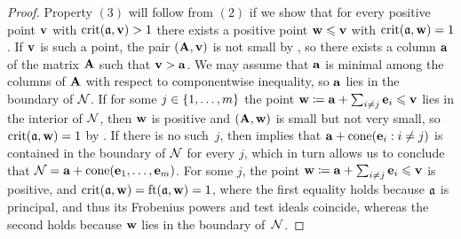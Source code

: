 \documentclass{amsart}
\begin{document}
\begin{proof}
   Property $(3)$ will follow from $(2)$ if we show that for every positive point $\mathbf{v}$ with $\operatorname{crit}(\mathfrak{a},\mathbf{v})>1$ there exists a positive point $\mathbf{w} \leqslant \mathbf{v}$ with $\operatorname{crit}(\mathfrak{a},\mathbf{w})=1$.
   If $\mathbf{v}$ is such a point, the pair $(\mathbf{A},\mathbf{v})$ is not small by , so there exists a column $\mathbf{a}$ of the matrix $\mathbf{A}$ such that $\mathbf{v} > \mathbf{a}$.
   We may assume that $\mathbf{a}$ is minimal among the columns of $\mathbf{A}$ with respect to componentwise inequality, so $\mathbf{a}$ lies in the boundary of $\mathcal{N}$.
   If for some $j \in \{1,\ldots,m\}$ the point $\mathbf{w} \coloneqq \mathbf{a}+ \sum_{i\ne j} \mathbf{e}_i \leqslant \mathbf{v}$ lies in the interior of $\mathcal{N}$, then $\mathbf{w}$ is positive and $(\mathbf{A},\mathbf{w})$ is small but not very small, so $\operatorname{crit}(\mathfrak{a},\mathbf{w}) = 1$ by .
   If there is no such~$j$, then  implies that $\mathbf{a}+\operatorname{cone}(\mathbf{e}_i: i\ne j)$ is contained in the boundary of $\mathcal{N}$ for every $j$, which in turn allows us to conclude that $\mathcal{N} = \mathbf{a} + \operatorname{cone}(\mathbf{e}_1,\ldots,\mathbf{e}_m)$.
   For some $j$, the point $\mathbf{w} \coloneqq \mathbf{a}+ \sum_{i\ne j} \mathbf{e}_i \leqslant \mathbf{v}$ is positive, and $\operatorname{crit}(\mathfrak{a},\mathbf{w}) = \operatorname{ft}(\mathfrak{a}, \mathbf{w}) =1$, where the first equality holds because $\mathfrak{a}$ is principal, and thus its Frobenius powers and test ideals coincide, whereas the second holds because $\mathbf{w}$ lies in the boundary of~$\mathcal{N}$.
\end{proof}
\end{document}
